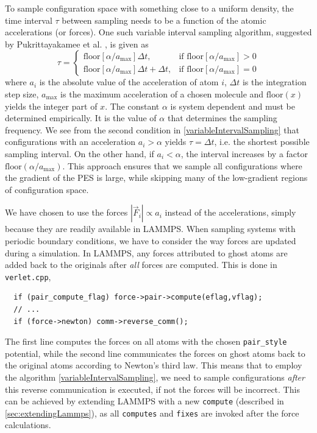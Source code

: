 \documentclass[twoside,english]{uiofysmaster}
\begin{document}
To sample configuration space with something close to a uniform density, the time interval $\tau$ between 
sampling needs to be a function of the atomic accelerations (or forces). One such variable 
interval sampling algorithm, suggested by Pukrittayakamee et al. \cite{Pukrittayakamee09}, is given as
\begin{equation}
 \tau = 
\begin{cases}
\textrm{floor}\left[\alpha/a_{\textrm{max}}\right]\Delta t, 
&\textrm{if floor}\left[\alpha/a_{\textrm{max}}\right] > 0 \\
\textrm{floor}\left[\alpha/a_{\textrm{max}}\right]\Delta t + \Delta t, 
&\textrm{if floor}\left[\alpha/a_{\textrm{max}}\right] = 0
\end{cases}
\label{variableIntervalSampling}
\end{equation}
where $a_i$ is the absolute value of the acceleration of atom $i$, $\Delta t$ is the integration step size, 
$a_\textrm{max}$ is the maximum acceleration of a chosen molecule and $\textrm{floor}(x)$ yields
the integer part of $x$. The constant $\alpha$ is system dependent and must be determined empirically. It is the value 
of $\alpha$ that determines the sampling frequency. We see from the second condition in \eqref{variableIntervalSampling} that
configurations with an acceleration $a_i > \alpha$ yields $\tau = \Delta t$, i.e. the shortest possible sampling
interval. On the other hand, if $a_i < \alpha$, the interval increases by a factor $\textrm{floor}(\alpha/a_\textrm{max})$. 
This approach ensures that we sample all configurations where the gradient of the PES is large, while skipping many
of the low-gradient regions of configuration space. 

We have chosen to use the forces $|\vec{F}_i| \propto a_i$ instead of the accelerations, simply because they are
readily available in LAMMPS. When sampling systems with periodic boundary conditions, we have to consider 
the way forces are updated during a simulation. In LAMMPS, any forces attributed to ghost atoms are added back 
to the originals after \textit{all} forces are computed. This is done in
\texttt{verlet.cpp},
\begin{listing}[H]
 \begin{verbatim}
  if (pair_compute_flag) force->pair->compute(eflag,vflag);
  // ...
  if (force->newton) comm->reverse_comm();
 \end{verbatim}
\end{listing}
The first line computes the forces on all atoms with the chosen \texttt{pair\_style} potential, while
the second line communicates the forces on ghost atoms back to the original atoms according to Newton's third law. 
This means that to employ the algorithm
\eqref{variableIntervalSampling}, we need to sample configurations \textit{after} this reverse communication is
executed, if not the forces will be incorrect. This can be achieved by extending LAMMPS with a new \texttt{compute} 
(described in \autoref{sec:extendingLammps}), as all \texttt{computes} and \texttt{fixes} are invoked after the
force calculations. 
\end{document}
